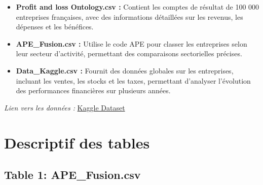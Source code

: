 \documentclass[mstat,12pt]{unswthesis}
\begin{document}
\begin{itemize}[label=$\circ$]
  \item \textnormal{\textbf{Profit and loss \- Ontology.csv :} Contient les comptes de résultat de 100 000 entreprises françaises, avec des informations détaillées sur les revenus, les dépenses et les bénéfices.}
  
  \item \textnormal{\textbf{APE\_Fusion.csv :} Utilise le code APE pour classer les entreprises selon leur secteur d’activité, permettant des comparaisons sectorielles précises.}

  \item \textnormal{\textbf{Data\_Kaggle.csv :} Fournit des données globales sur les entreprises, incluant les ventes, les stocks et les taxes, permettant d'analyser l’évolution des performances financières sur plusieurs années.}
\end{itemize}

\medskip

\textit{Lien vers les données :}
\href{https://www.kaggle.com/datasets/briaclg/financial-data-of-french-compagnies/data?select=Profit+and+loss+-+Onthology.csv}{Kaggle Dataset}

\section{Descriptif des tables}\label{descriptif-des-tables}

\bigskip

\subsection{Table 1: APE\_Fusion.csv}\label{table-1-ape_fusion.csv}
\end{document}
